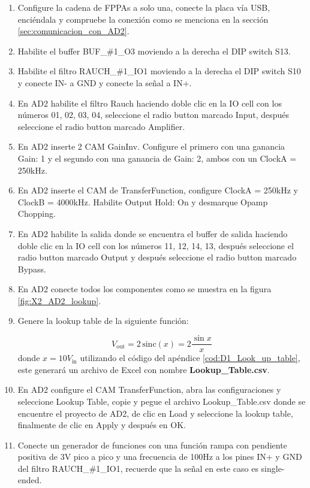 	\begin{enumerate}
		\item Configure la cadena de FPPAs a solo una, conecte la placa vía USB,  enciéndala y compruebe la conexión como se menciona en la sección \ref{sec:comunicacion_con_AD2}.
		
		\item Habilite el buffer BUF\_{}\#{}1\_{}O3 moviendo a la derecha el DIP switch S13.
		
		\item Habilite el filtro RAUCH\_{}\#{}1\_{}IO1 moviendo a la derecha el DIP switch S10 y conecte IN- a GND y conecte la señal a IN+.
		
		\item En AD2 habilite el filtro Rauch haciendo doble clic en la IO cell con los números 01, 02, 03, 04, seleccione el radio button marcado Input, después seleccione el radio button marcado Amplifier.
		
		\item En AD2 inserte 2 CAM GainInv. Configure el primero con una ganancia Gain: 1 y el segundo con una ganancia  de Gain: 2, ambos con un ClockA = 250kHz. 
		
		\item En AD2 inserte el CAM de TransferFunction, configure ClockA = 250kHz y ClockB = 4000kHz. Habilite Output Hold: On y desmarque Opamp Chopping.
		
		\item En AD2 habilite la salida donde se encuentra el buffer de salida haciendo doble clic en la IO cell con los números 11, 12, 14, 13, después seleccione el radio button marcado Output y después seleccione el radio button marcado Bypass.
		
		\item En AD2 conecte todos los componentes como se muestra en la figura \ref{fig:X2_AD2_lookup}.
		
		\item Genere la lookup table de la siguiente función:
		 
		\begin{equation}
			V_{\textrm{out}} = 2 \, \textrm{sinc} (x) =  2 \frac{ \sin x }{ x}
		\end{equation}
		donde $x = 10 V_{\textrm{in}} $ utilizando el código del apéndice \ref{cod:D1_Look_up_table}, este generará un archivo de Excel con nombre \textbf{Lookup\_{}Table.csv}.
		
		\item En AD2 configure el CAM TransferFunction, abra las configuraciones y seleccione Lookup Table, copie y pegue el archivo Lookup\_{}Table.csv donde se encuentre el proyecto de AD2, de clic en Load y seleccione la lookup table, finalmente de clic en Apply y después en OK.
		\item Conecte un generador de funciones con una función rampa con pendiente positiva de 3V pico a pico y una frecuencia de 100Hz a los pines IN+ y GND del filtro RAUCH\_{}\#{}1\_{}IO1, recuerde que la señal en este caso es single-ended.
		

\end{enumerate}
